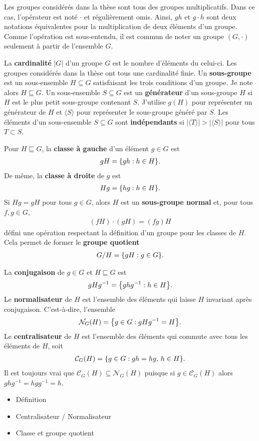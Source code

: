 Les groupes considérés dans la thèse sont tous des groupes multiplicatifs.
Dans ce cas, l'opérateur est noté $\cdot$ et régulièrement omis.
Ainsi, $gh$ et $g \cdot h$ sont deux notations équivalentes pour la multiplication 
de deux éléments d'un groupe.
Comme l'opération est sous-entendu,
il est commun de noter un groupe $(G, \cdot)$ seulement à partir de l'ensemble $G$.

La \textbf{cardinalité} $|G|$ d'un groupe $G$ est le nombre d'éléments du celui-ci.
Les groupes considérés dans la thèse ont tous une cardinalité finie.
Un \textbf{sous-groupe} est un sous-ensemble $H \subseteq G$ satisfaisant les trois conditions
d'un groupe.
Je note alors $H \sqsubseteq G$.
Un sous-ensemble $S \subseteq G$ est un \textbf{générateur} d'un sous-groupe $H$ si $H$ est le plus petit
sous-groupe contenant $S$.
J'utilise $g(H)$ pour représenter un générateur de $H$ 
et $\langle S \rangle$ pour représenter le sous-groupe généré par $S$.
Les éléments d'un sous-ensemble $S \subseteq G$ sont \textbf{indépendants} si 
$|\langle T \rangle| > |\langle S \rangle|$ pour tous $T \subset S$.

Pour $H \sqsubseteq G$,
la \textbf{classe à gauche} d'un élément $g \in G$ est
\begin{align}
  gH = \qty{gh : h \in H}.
\end{align}
De même,
la \textbf{classe à droite} de $g$ est 
\begin{align}
  Hg = \qty{hg : h \in H}.
\end{align}
Si $Hg = gH$ pour tous $g \in G$,
alors $H$ est un \textbf{sous-groupe normal} et,
pour tous $f, g \in G$,
\begin{align}
  (fH)\cdot(gH) = (fg)H
\end{align}
défini une opération respectant la définition d'un groupe pour les classes de $H$.
Cela permet de former le \textbf{groupe quotient} 
\begin{align}
  G / H = \qty{gH : g \in G}.
\end{align}

La \textbf{conjugaison} de $g \in G$ et $H \sqsubseteq G$ est 
\begin{align}
  gHg^{-1} = \qty{ghg^{-1} : h \in H}.
\end{align}
Le \textbf{normalisateur} de $H$ est l'ensemble des éléments qui laisse $H$
invariant après conjugaison.
C'est-à-dire, l'ensemble
\begin{align}
  \mathcal{N}_G(H) = \qty{g \in G : gHg^{-1} = H}.
\end{align}
Le \textbf{centralisateur} de $H$ est l'ensemble des éléments qui commute avec
tous les éléments de $H$, soit
\begin{align}
  \mathcal{C}_G(H) = \qty{g \in G : gh = hg,\, h \in H}.
\end{align}
Il est toujours vrai que $\mathcal{C}_G(H) \subseteq \mathcal{N}_G(H)$ puisque
si $g \in \mathcal{C}_G(H)$ alors $ghg^{-1} = hgg^{-1} = h$.




\begin{itemize}
  \item Définition
  \item Centralisateur / Normalisateur
  \item Classe et groupe quotient
\end{itemize}


